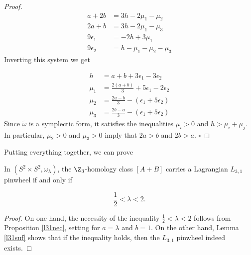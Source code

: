 \begin{proof}
\begin{align*}
    a+2b&=3h-2\mu_1-\mu_2 \\ 
     2a+b&=3h-2\mu_1-\mu_3\\
    9\epsilon_1&=-2h+3\mu_1\\
    9\epsilon_2&=h-\mu_1-\mu_2-\mu_3
\end{align*}
Inverting this system we get

\begin{align*}\label{solved}
    h&=a + b + 3\epsilon_1 - 3\epsilon_2\\
    \mu_1&=\frac{2(a+b)}{3}+5\epsilon_1-2\epsilon_2\\
    \mu_2&=\frac{2a-b}{3}-(\epsilon_1+5\epsilon_2)\\
    \mu_3&=\frac{2b-a}{3}-(\epsilon_1+5\epsilon_2)
\end{align*}
Since $\tilde{\omega}$ is a symplectic form, it satisfies the inequalities $\mu_i>0$ and $h>\mu_i+\mu_j$. In particular, $\mu_2>0$ and $\mu_3>0$ imply that $2a>b$ and $2b>a$. $\square$
\end{proof}


Putting everything together, we can prove

\begin{Theorem}\label{jquestion}
In $(S^2\times S^2,\omega_\lambda)$, the $\Z_3$-homology class $[A+B]$ carries a Lagrangian $L_{3,1}$ pinwheel if and only if

\[\frac{1}{2}<\lambda<2.\]

\end{Theorem}

\begin{proof}
On one hand, the necessity of the inequality $\frac{1}{2}<\lambda<2$ follows from Proposition \ref{l31nec}, setting for $a=\lambda$ and $b=1$. On the other hand, Lemma \ref{l31suf} shows that if the inequality holds, then the $L_{3,1}$ pinwheel indeed exists.
\end{proof}
































\printbibliography







